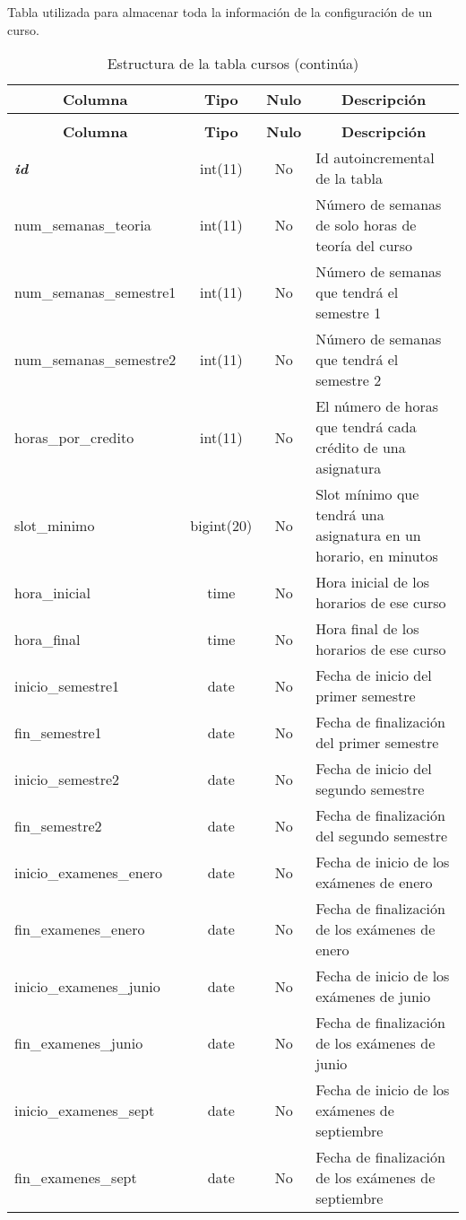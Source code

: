 Tabla utilizada para almacenar toda la información de la configuración de un curso.
%
%
 \begin{longtable}{|l|c|c|l|} 
 \caption{Estructura de la tabla cursos} \label{tab:cursos-structure} \\
 \hline \multicolumn{1}{|c|}{\textbf{Columna}} & \multicolumn{1}{|c|}{\textbf{Tipo}} & \multicolumn{1}{|c|}{\textbf{Nulo}} & \multicolumn{1}{|c|}{\textbf{Descripción}} \\ \hline \hline
\endfirsthead
 \caption{Estructura de la tabla cursos (continúa)} \\ 
 \hline \multicolumn{1}{|c|}{\textbf{Columna}} & \multicolumn{1}{|c|}{\textbf{Tipo}} & \multicolumn{1}{|c|}{\textbf{Nulo}} & \multicolumn{1}{|c|}{\textbf{Descripción}} \\ \hline \hline \endhead \endfoot 
\textbf{\textit{id}} & int(11) & No &  Id autoincremental de la tabla \\ \hline 
num\_semanas\_teoria & int(11) & No & Número de semanas de solo horas de teoría del curso \\ \hline 
num\_semanas\_semestre1 & int(11) & No & Número de semanas que tendrá el semestre 1 \\ \hline 
num\_semanas\_semestre2 & int(11) & No & Número de semanas que tendrá el semestre 2 \\ \hline 
horas\_por\_credito & int(11) & No & El número de horas que tendrá cada crédito de una asignatura \\ \hline 
slot\_minimo & bigint(20) & No & Slot mínimo que tendrá una asignatura en un horario, en minutos \\ \hline 
hora\_inicial & time & No & Hora inicial de los horarios de ese curso \\ \hline 
hora\_final & time & No & Hora final de los horarios de ese curso \\ \hline 
inicio\_semestre1 & date & No & Fecha de inicio del primer semestre \\ \hline 
fin\_semestre1 & date & No & Fecha de finalización del primer semestre \\ \hline 
inicio\_semestre2 & date & No & Fecha de inicio del segundo semestre \\ \hline 
fin\_semestre2 & date & No & Fecha de finalización del segundo semestre \\ \hline 
inicio\_examenes\_enero & date & No & Fecha de inicio de los exámenes de enero \\ \hline 
fin\_examenes\_enero & date & No & Fecha de finalización de los exámenes de enero \\ \hline 
inicio\_examenes\_junio & date & No & Fecha de inicio de los exámenes de junio \\ \hline 
fin\_examenes\_junio & date & No & Fecha de finalización de los exámenes de junio \\ \hline 
inicio\_examenes\_sept & date & No & Fecha de inicio de los exámenes de septiembre \\ \hline 
fin\_examenes\_sept & date & No & Fecha de finalización de los exámenes de septiembre \\ \hline 
 \end{longtable}

